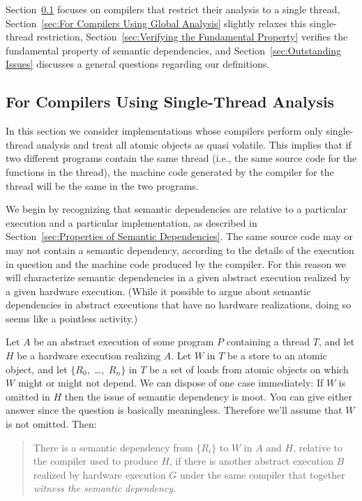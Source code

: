 \documentclass[10]{article}
\begin{document}
Section~\ref{sec:For Compilers Using Single-Thread Analysis}
focuses on compilers that restrict their analysis to a single
thread,
Section~\ref{sec:For Compilers Using Global Analysis}
slightly relaxes this single-thread restriction,
Section~\ref{sec:Verifying the Fundamental Property}
verifies the fundamental property of semantic dependencies,
and
Section~\ref{sec:Outstanding Issues}
discusses a general questions regarding our definitions.

\subsection{For Compilers Using Single-Thread Analysis}
\label{sec:For Compilers Using Single-Thread Analysis}

In this section we consider implementations whose compilers perform
only single-thread analysis and treat all atomic objects as
quasi volatile.
This implies that if two different programs contain the same thread
(i.e., the same source code for the functions in the thread), the
machine code generated by the compiler for the thread will be the
same in the two programs.

We begin by recognizing that semantic dependencies are relative to a
particular execution and a particular implementation,
as described in Section~\ref{sec:Properties of Semantic Dependencies}.
The same source code may or may not contain a semantic dependency,
according to the details of the execution in question and the
machine code produced by the compiler.
For this reason we will characterize semantic dependencies in a given
abstract execution realized by a given hardware execution.
(While it possible to argue about semantic dependencies in abstract
executions that have no hardware realizations, doing so seems like a
pointless activity.)

Let $A$ be an abstract execution of some program $P$ containing a
thread $T$, and let $H$ be a hardware execution realizing $A$.
Let $W$ in $T$ be a store to an atomic object, and let $\{R_0,$
\ldots,~$R_n\}$ in $T$ be a set of loads from atomic objects on which
$W$ might or might not depend.
We can dispose of one case immediately: If $W$ is omitted in $H$ then
the issue of semantic dependency is moot.
You can give either answer since the question is basically meaningless.
Therefore we'll assume that $W$ is not omitted.
Then:
\begin{quote}
There is a semantic dependency from $\{R_i\}$ to $W$ in $A$ and $H$,
relative to the compiler used to produce $H$, if there is another
abstract execution $B$ realized by hardware execution $G$ under the
same compiler that together \emph{witness the semantic dependency}.
\end{quote}
\end{document}
